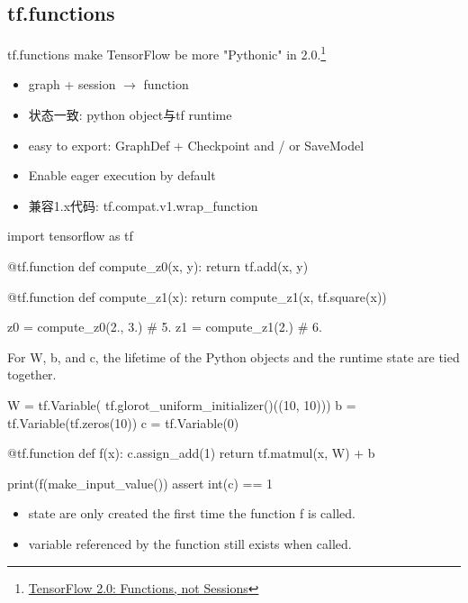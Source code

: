 
\subsection{tf.functions}

\begin{frame}{tf.functions}
    make TensorFlow be more "Pythonic" in 2.0.\footnote{\href{https://github.com/tensorflow/community/pull/20}{TensorFlow 2.0: Functions, not Sessions}}

    \begin{itemize}
        \item graph + session $\to$ function
        \item 状态一致: python object与tf runtime
        \item easy to export: GraphDef + Checkpoint and / or SaveModel
        \item Enable eager execution by default
        \item 兼容1.x代码: tf.compat.v1.wrap\_function
    \end{itemize}
\end{frame}

\begin{frame}[fragile]
    \begin{tcblisting}{}
        import tensorflow as tf

        @tf.function
        def compute_z0(x, y):
          return tf.add(x, y)

        @tf.function
        def compute_z1(x):
          return compute_z1(x, tf.square(x))

        z0 = compute_z0(2., 3.)
        # 5.
        z1 = compute_z1(2.)
        # 6.
    \end{tcblisting}
\end{frame}

\begin{frame}[fragile]
    For W, b, and c, the lifetime of the Python objects and the runtime state are tied together.

    \begin{tcblisting}{}
        W = tf.Variable(
            tf.glorot_uniform_initializer()((10, 10)))
        b = tf.Variable(tf.zeros(10))
        c = tf.Variable(0)

        @tf.function
        def f(x):
          c.assign_add(1)
          return tf.matmul(x, W) + b

        print(f(make_input_value())
        assert int(c) == 1
    \end{tcblisting}

    \begin{itemize}
        \item state are only created the first time the function f is called.
        \item variable referenced by the function still exists when called.
    \end{itemize}
\end{frame}

